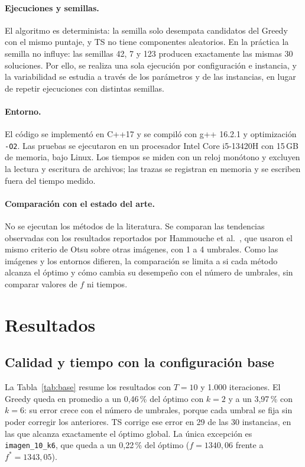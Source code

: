 \documentclass[letter, 10pt]{article}
\begin{document}
\paragraph{Ejecuciones y semillas.} El algoritmo es determinista: la semilla solo desempata candidatos del Greedy con el mismo puntaje, y TS no tiene componentes aleatorios. En la práctica la semilla no influye: las semillas 42, 7 y 123 producen exactamente las mismas 30 soluciones. Por ello, se realiza una sola ejecución por configuración e instancia, y la variabilidad se estudia a través de los parámetros y de las instancias, en lugar de repetir ejecuciones con distintas semillas.

\paragraph{Entorno.} El código se implementó en C++17 y se compiló con g++ 16.2.1 y optimización \texttt{-O2}. Las pruebas se ejecutaron en un procesador Intel Core i5-13420H con 15\,GB de memoria, bajo Linux. Los tiempos se miden con un reloj monótono y excluyen la lectura y escritura de archivos; las trazas se registran en memoria y se escriben fuera del tiempo medido.

\paragraph{Comparación con el estado del arte.} No se ejecutan los métodos de la literatura. Se comparan las tendencias observadas con los resultados reportados por Hammouche et al.~\cite{Hammouche2010Comparative}, que usaron el mismo criterio de Otsu sobre otras imágenes, con 1 a 4 umbrales. Como las imágenes y los entornos difieren, la comparación se limita a si cada método alcanza el óptimo y cómo cambia su desempeño con el número de umbrales, sin comparar valores de $f$ ni tiempos.

\section{Resultados}
\label{sec:resultados}

\subsection{Calidad y tiempo con la configuración base}
La Tabla~\ref{tab:base} resume los resultados con $T = 10$ y 1.000 iteraciones. El Greedy queda en promedio a un 0,46\,\% del óptimo con $k = 2$ y a un 3,97\,\% con $k = 6$: su error crece con el número de umbrales, porque cada umbral se fija sin poder corregir los anteriores. TS corrige ese error en 29 de las 30 instancias, en las que alcanza exactamente el óptimo global. La única excepción es \texttt{imagen\_10\_k6}, que queda a un 0,22\,\% del óptimo ($f = 1340{,}06$ frente a $f^* = 1343{,}05$).
\end{document}
